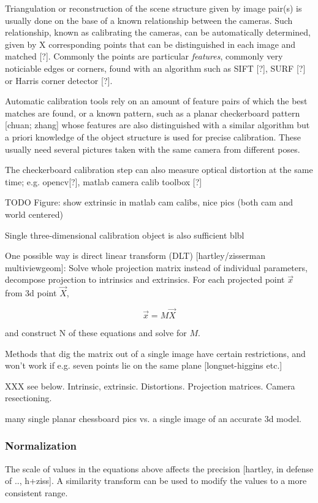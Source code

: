 Triangulation or reconstruction of the scene structure given by image pair(s) is usually done on the base of a known relationship between the cameras. Such relationship, known as calibrating the cameras, can be automatically determined, given by X corresponding points that can be distinguished in each image and matched [?]. Commonly the points are particular \emph{features}, commonly very noticiable edges or corners, found with an algorithm such as SIFT [?], SURF [?] or Harris corner detector [?].

Automatic calibration tools rely on an amount of feature pairs of which the best matches are found, or a known pattern, such as a planar checkerboard pattern [chuan; zhang] whose features are also distinguished with a similar algorithm but a priori knowledge of the object structure is used for precise calibration. These usually need several pictures taken with the same camera from different poses.

The checkerboard calibration step can also measure optical distortion at the same time; e.g. opencv[?], matlab camera calib toolbox [?]

TODO Figure: show extrinsic in matlab cam calibs, nice pics (both cam and world centered)

Single three-dimensional calibration object is also sufficient blbl

One possible way is direct linear transform (DLT) [hartley/zisserman multiviewgeom]: Solve whole projection matrix instead of individual parameters, decompose projection to intrinsics and extrinsics. For each projected point $\vec x$ from 3d point $\vec X$,

\[
	\vec x = M \vec X
\]

and construct N of these equations and solve for $M$.

Methods that dig the matrix out of a single image have certain restrictions, and won't work if e.g. seven points lie on the same plane [longuet-higgins etc.]

XXX see below. Intrinsic, extrinsic. Distortions. Projection matrices. Camera resectioning.

many single planar chessboard pics vs. a single image of an accurate 3d model.

\subsubsection{Normalization}

The scale of values in the equations above affects the precision [hartley, in defense of .., h+ziss]. A similarity transform can be used to modify the values to a more consistent range.

